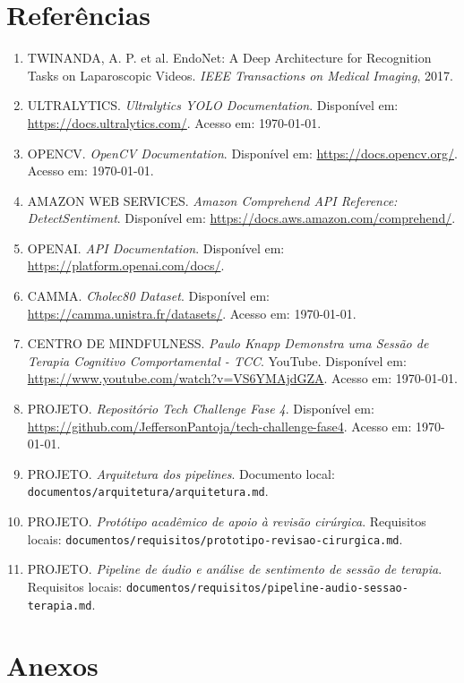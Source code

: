 \documentclass[12pt,a4paper]{article}
\begin{document}
\section*{Referências}
\begin{enumerate}
  \item TWINANDA, A. P. et al. EndoNet: A Deep Architecture for Recognition Tasks on Laparoscopic Videos. \textit{IEEE Transactions on Medical Imaging}, 2017.
  \item ULTRALYTICS. \textit{Ultralytics YOLO Documentation}. Disponível em: \url{https://docs.ultralytics.com/}. Acesso em: \today.
  \item OPENCV. \textit{OpenCV Documentation}. Disponível em: \url{https://docs.opencv.org/}. Acesso em: \today.
  \item AMAZON WEB SERVICES. \textit{Amazon Comprehend API Reference: DetectSentiment}. Disponível em: \url{https://docs.aws.amazon.com/comprehend/}.
  \item OPENAI. \textit{API Documentation}. Disponível em: \url{https://platform.openai.com/docs/}.
  \item CAMMA. \textit{Cholec80 Dataset}. Disponível em: \url{https://camma.unistra.fr/datasets/}. Acesso em: \today.
  \item CENTRO DE MINDFULNESS. \textit{Paulo Knapp Demonstra uma Sessão de Terapia Cognitivo Comportamental - TCC}. YouTube. Disponível em: \url{https://www.youtube.com/watch?v=VS6YMAjdGZA}. Acesso em: \today.
  \item PROJETO. \textit{Repositório Tech Challenge Fase 4}. Disponível em: \url{https://github.com/JeffersonPantoja/tech-challenge-fase4}. Acesso em: \today.
  \item PROJETO. \textit{Arquitetura dos pipelines}. Documento local: \texttt{documentos/arquitetura/arquitetura.md}.
  \item PROJETO. \textit{Protótipo acadêmico de apoio à revisão cirúrgica}. Requisitos locais: \texttt{documentos/requisitos/prototipo-revisao-cirurgica.md}.
  \item PROJETO. \textit{Pipeline de áudio e análise de sentimento de sessão de terapia}. Requisitos locais: \texttt{documentos/requisitos/pipeline-audio-sessao-terapia.md}.
\end{enumerate}

\clearpage
\appendix
\section{Anexos}
\end{document}
